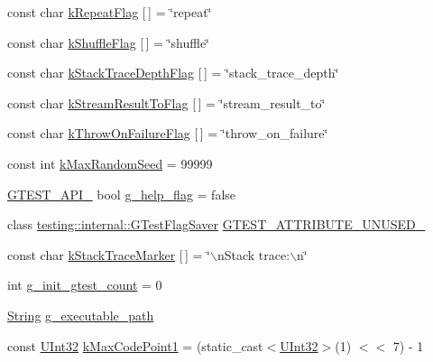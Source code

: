 \begin{DoxyCompactItemize}
\item 
const char \hyperlink{namespacetesting_1_1internal_a16c8fa0cc0f7bae57e88cfcbdf46cd57}{k\-Repeat\-Flag} \mbox{[}$\,$\mbox{]} = \char`\"{}repeat\char`\"{}
\item 
const char \hyperlink{namespacetesting_1_1internal_a49a373cb8c0bc9eae2a39e8122e753cc}{k\-Shuffle\-Flag} \mbox{[}$\,$\mbox{]} = \char`\"{}shuffle\char`\"{}
\item 
const char \hyperlink{namespacetesting_1_1internal_a8dc0484b79056e6319003f4a933c7c9b}{k\-Stack\-Trace\-Depth\-Flag} \mbox{[}$\,$\mbox{]} = \char`\"{}stack\-\_\-trace\-\_\-depth\char`\"{}
\item 
const char \hyperlink{namespacetesting_1_1internal_a146c6b52bb1400ba13d45c539034af16}{k\-Stream\-Result\-To\-Flag} \mbox{[}$\,$\mbox{]} = \char`\"{}stream\-\_\-result\-\_\-to\char`\"{}
\item 
const char \hyperlink{namespacetesting_1_1internal_a2ada1f0b59f090f1791291c533c793f2}{k\-Throw\-On\-Failure\-Flag} \mbox{[}$\,$\mbox{]} = \char`\"{}throw\-\_\-on\-\_\-failure\char`\"{}
\item 
const int \hyperlink{namespacetesting_1_1internal_a19c875806aebc654557928c5df5f8ea5}{k\-Max\-Random\-Seed} = 99999
\item 
\hyperlink{gtest-port_8h_aa73be6f0ba4a7456180a94904ce17790}{\-G\-T\-E\-S\-T\-\_\-\-A\-P\-I\-\_\-} bool \hyperlink{namespacetesting_1_1internal_a05b77c93e2ac596346466a00277288ca}{g\-\_\-help\-\_\-flag} = false
\item 
class \*
\hyperlink{classtesting_1_1internal_1_1GTestFlagSaver}{testing\-::internal\-::\-G\-Test\-Flag\-Saver} \hyperlink{namespacetesting_1_1internal_a0404ab5679c87afbdd73e4161836e15a}{\-G\-T\-E\-S\-T\-\_\-\-A\-T\-T\-R\-I\-B\-U\-T\-E\-\_\-\-U\-N\-U\-S\-E\-D\-\_\-}
\item 
const char \hyperlink{namespacetesting_1_1internal_a735beafdf3dc508442f783a0269ca0f5}{k\-Stack\-Trace\-Marker} \mbox{[}$\,$\mbox{]} = \char`\"{}$\backslash$n\-Stack trace\-:$\backslash$n\char`\"{}
\item 
int \hyperlink{namespacetesting_1_1internal_a5d56c8e20bffcfc3a4c2c1805f815ab5}{g\-\_\-init\-\_\-gtest\-\_\-count} = 0
\item 
\hyperlink{classtesting_1_1internal_1_1String}{\-String} \hyperlink{namespacetesting_1_1internal_a00eb28c08b6a4da5387d466add2f742a}{g\-\_\-executable\-\_\-path}
\item 
const \hyperlink{namespacetesting_1_1internal_a03df445d5850459574de6ffb6f57ae95}{\-U\-Int32} \hyperlink{namespacetesting_1_1internal_a842ee44b2d352fa626e9c0cc37486e34}{k\-Max\-Code\-Point1} = (static\-\_\-cast$<$\hyperlink{namespacetesting_1_1internal_a03df445d5850459574de6ffb6f57ae95}{\-U\-Int32}$>$(1) $<$$<$ 7) -\/ 1
$$
\end{DoxyCompactItemize}
